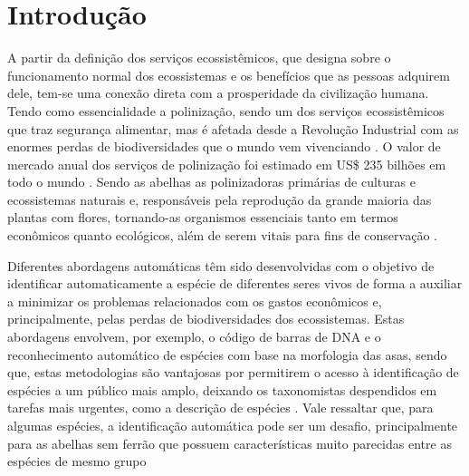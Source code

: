 \documentclass[
	12pt,				%
	oneside,			%
	a4paper,			%
	english,			%
	brazil				%
	]{abntex2ppgsi}
\begin{document}
\tableofcontents*
\cleardoublepage



\textual



% 
%
%

\chapter{Introdução}
A partir da definição dos serviços ecossistêmicos, que designa sobre o funcionamento normal dos ecossistemas e os benefícios que as pessoas adquirem dele, tem-se uma conexão direta com a prosperidade da civilização humana. Tendo como essencialidade a polinização, sendo um dos serviços ecossistêmicos que traz segurança alimentar, mas é afetada desde a Revolução Industrial com as enormes perdas de biodiversidades que o mundo vem vivenciando \cite{rockstrom2009safe}. O valor de mercado anual dos serviços de polinização foi estimado em US\$ 235 bilhões em todo o mundo \cite{potts2016assessment}. Sendo as abelhas as polinizadoras primárias de culturas e ecossistemas naturais e, responsáveis pela reprodução da grande maioria das plantas com flores, tornando-as organismos essenciais tanto em termos econômicos quanto ecológicos, além de serem vitais para fins de conservação \cite{rebelo2021fully}.

Diferentes abordagens automáticas têm sido desenvolvidas com o objetivo de identificar automaticamente a espécie de diferentes seres vivos de forma a auxiliar a minimizar os problemas relacionados com os gastos econômicos e, principalmente, pelas perdas de biodiversidades dos ecossistemas. Estas abordagens envolvem, por exemplo, o código de barras de DNA e o reconhecimento automático de espécies com base na morfologia das asas, sendo que, estas metodologias são vantajosas por permitirem o acesso à identificação de espécies a um público mais amplo, deixando os taxonomistas despendidos em tarefas mais urgentes, como a descrição de espécies \cite{rebelo2021fully}. Vale ressaltar que, para algumas espécies, a identificação automática pode ser um desafio, principalmente para as abelhas sem ferrão que possuem características muito parecidas entre as espécies de mesmo grupo \cite{francoy2010morfometria}
\end{document}
